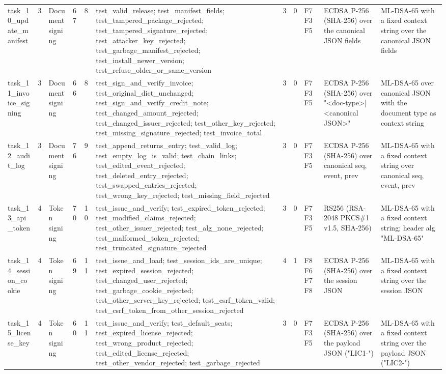 \begin{table}[t]
\begin{tabular}{lllllllllll}
task\_10\_update\_manifest & 3 & Document signing & 67 & 8 & test\_valid\_release; test\_manifest\_fields; test\_tampered\_package\_rejected; test\_tampered\_signature\_rejected; test\_attacker\_key\_rejected; test\_garbage\_manifest\_rejected; test\_install\_newer\_version; test\_refuse\_older\_or\_same\_version & 3 & 0 & F7 F3 F5 & ECDSA P-256 (SHA-256) over the canonical JSON fields & ML-DSA-65 with a fixed context string over the canonical JSON fields \\
task\_11\_invoice\_signing & 3 & Document signing & 66 & 8 & test\_sign\_and\_verify\_invoice; test\_original\_dict\_unchanged; test\_sign\_and\_verify\_credit\_note; test\_changed\_amount\_rejected; test\_changed\_issuer\_rejected; test\_other\_key\_rejected; test\_missing\_signature\_rejected; test\_invoice\_total & 3 & 0 & F7 F3 F5 & ECDSA P-256 (SHA-256) over "<doc-type>|<canonical JSON>" & ML-DSA-65 over canonical JSON with the document type as context string \\
task\_12\_audit\_log & 3 & Document signing & 76 & 9 & test\_append\_returns\_entry; test\_valid\_log; test\_empty\_log\_is\_valid; test\_chain\_links; test\_edited\_event\_rejected; test\_deleted\_entry\_rejected; test\_swapped\_entries\_rejected; test\_wrong\_key\_rejected; test\_missing\_field\_rejected & 3 & 0 & F7 F3 F5 & ECDSA P-256 (SHA-256) over canonical {seq, event, prev} & ML-DSA-65 with a fixed context string over canonical {seq, event, prev} \\
task\_13\_api\_token & 4 & Token signing & 70 & 10 & test\_issue\_and\_verify; test\_expired\_token\_rejected; test\_modified\_claims\_rejected; test\_other\_issuer\_rejected; test\_alg\_none\_rejected; test\_malformed\_token\_rejected; test\_truncated\_signature\_rejected & 3 & 0 & F7 F3 F5 & RS256 (RSA-2048 PKCS\#1 v1.5, SHA-256) & ML-DSA-65 with a fixed context string; header alg "ML-DSA-65" \\
task\_14\_session\_cookie & 4 & Token signing & 69 & 11 & test\_issue\_and\_load; test\_session\_ids\_are\_unique; test\_expired\_session\_rejected; test\_changed\_user\_rejected; test\_garbage\_cookie\_rejected; test\_other\_server\_key\_rejected; test\_csrf\_token\_valid; test\_csrf\_token\_from\_other\_session\_rejected & 4 & 1 & F8 F6 F7 F8 & ECDSA P-256 (SHA-256) over the session JSON & ML-DSA-65 with a fixed context string over the session JSON \\
task\_15\_license\_key & 4 & Token signing & 60 & 11 & test\_issue\_and\_verify; test\_default\_seats; test\_expired\_license\_rejected; test\_wrong\_product\_rejected; test\_edited\_license\_rejected; test\_other\_vendor\_rejected; test\_garbage\_rejected & 3 & 0 & F7 F3 F5 & ECDSA P-256 (SHA-256) over the payload JSON ("LIC1-") & ML-DSA-65 with a fixed context string over the payload JSON ("LIC2-") \\

\end{tabular}
\end{table}

